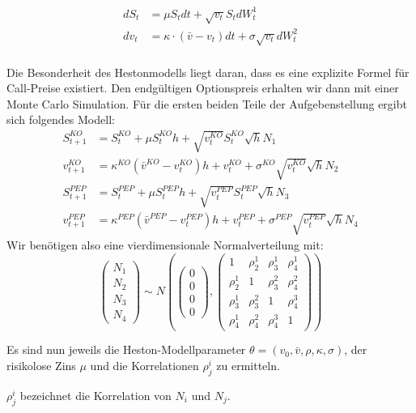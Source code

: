 \documentclass[12pt]{article}
\begin{document}
\begin{align} \label{SPDE}
dS_t &= \mu S_t dt + \sqrt{v_t} S_t dW^1_t \\
dv_t &= \kappa\cdot(\bar{v}-v_t) dt + \sigma \sqrt{v_t}dW^2_t \\
\end{align}

 Die Besonderheit des Hestonmodells liegt daran, dass es eine explizite Formel für Call-Preise existiert. Den endgültigen Optionspreis erhalten wir dann mit einer Monte Carlo Simulation. Für die ersten beiden Teile der Aufgebenstellung ergibt sich folgendes Modell:
\begin{align*}
S^{KO}_{t+1}&=S^{KO}_{t}+\mu S^{KO}_{t}h+\sqrt{v^{KO}_t}S^{KO}_{t}\sqrt{h}N_1\\
v^{KO}_{t+1}&=\kappa^{KO}(\bar{v}^{KO}-v^{KO}_t)h+v^{KO}_t+\sigma^{KO}\sqrt{v^{KO}_t}\sqrt{h}N_2\\
S^{PEP}_{t+1}&=S^{PEP}_{t}+\mu S^{PEP}_{t}h+\sqrt{v^{PEP}_t}S^{PEP}_{t}\sqrt{h}N_3\\
v^{PEP}_{t+1}&=\kappa^{PEP}(\bar{v}^{PEP}-v^{PEP}_t)h+v^{PEP}_t+\sigma^{PEP}\sqrt{v^{PEP}_t}\sqrt{h}N_4
\end{align*}
Wir benötigen also eine vierdimensionale Normalverteilung mit:
\begin{equation*}
\left({\begin{array}{c} N_1\\ N_2\\ N_3\\ N_4\end{array}}\right) \sim N\left(\left({\begin{array}{c} 0 \\ 0 \\ 0 \\ 0 \end{array}}\right),\left({\begin{array}{cccc} 1 & \rho^1_2 & \rho^1_3 & \rho^1_4\\ \rho^1_2 & 1 & \rho^2_3 & \rho^2_4 \\ \rho^1_3 & \rho^2_3 & 1 & \rho^3_4 \\ \rho^1_4 & \rho^2_4 & \rho^3_4 & 1 \end{array}}\right)\right)
\end{equation*}

Es sind nun jeweils die Heston-Modellparameter $\theta=(v_0,\bar v, \rho, \kappa, \sigma)$, der risikolose Zins $\mu$ und die Korrelationen $\rho^i_j$ zu ermitteln.


$\rho^{i}_j$ bezeichnet die Korrelation von $N_i$ und $N_j$.
\end{document}
